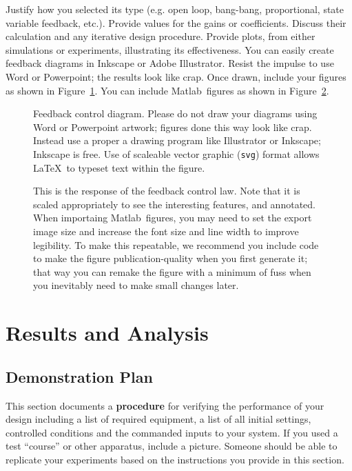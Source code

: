 \documentclass{wrcecapstone}
\newcommand{\Matlab}{Matlab} %
\begin{document}
Justify how you selected its type (e.g.  open loop, bang-bang, proportional, state variable feedback, etc.). Provide values for the gains or coefficients.  Discuss their calculation and any iterative design procedure.  Provide plots, from either simulations or experiments, illustrating its effectiveness.  You can easily create feedback diagrams in Inkscape or Adobe Illustrator.  Resist the impulse to use Word or Powerpoint; the results look like crap. Once drawn, include your figures as shown in Figure~\ref{f4}.   You can include \Matlab\ figures as shown in Figure~\ref{f5}.
\begin{figure}[p]
\begin{center}

\end{center}
\caption{Feedback control diagram. Please do not draw your diagrams using Word or Powerpoint artwork; figures done this way look like crap. Instead use a proper a drawing program like Illustrator or Inkscape; Inkscape is free. Use of scaleable vector graphic (\lstinline{svg}) format allows \LaTeX\ to typeset text within the figure.} 
\label{f4}
\end{figure}
\begin{figure}[p]
\begin{center}

\end{center}
\caption{This is the response of the feedback control law.   Note that it is scaled appropriately to see the interesting features, and annotated.   When importaing \Matlab\ figures, you may need to set the export image size and increase the font size and line width to improve legibility. To make this repeatable, we recommend you include code to make the figure publication-quality when you first generate it; that way you can remake the figure with a minimum of fuss when you inevitably need to make small changes later.}
\label{f5}
\end{figure}





\section{Results and Analysis}

\subsection{Demonstration Plan}
This section documents a \textbf{procedure} for verifying the performance of your design including a list of required equipment, a list of all initial settings, controlled conditions and the commanded inputs to your system. If you used a test ``course'' or other apparatus, include a picture.  Someone should be able to replicate your experiments based on the instructions you provide in this section.  
\end{document}
